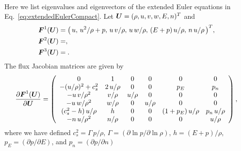 \documentclass[10pt,preprint]{aastex}
\begin{document}
Here we list eigenvalues and eigenvectors of the extended Euler equations in Eq.~\eqref{eq:extendedEulerCompact}.  
Let $\boldsymbol{U}=(\rho,u,v,w,E,n)^{T}$ and 
\begin{align}
  \boldsymbol{F}^{1}(\boldsymbol{U})
  &=\big(\,u,\,u^{2}/\rho+p,\,u\,v/\rho,\,u\,w/\rho,\,(E+p)\,u/\rho,\,n\,u/\rho\,\big)^{T}, \\
  \boldsymbol{F}^{2}(\boldsymbol{U})
  &=, \\
  \boldsymbol{F}^{3}(\boldsymbol{U})
  &=.
\end{align}
The flux Jacobian matrices are given by
\begin{align}
  \frac{\partial \boldsymbol{F}^{1}(\boldsymbol{U})}{\partial \boldsymbol{U}}
  =
  \left(
  \begin{array}{cccccc}
  0 & 1 & 0 & 0 & 0 & 0 \\
  -(u/\rho)^{2}+c_{s}^{2} & 2\,u/\rho & 0 & 0 & p_{E} & p_{n} \\
  - u\,v/\rho^{2} & v/\rho & u/\rho & 0 & 0 & 0 \\
  - u\,w/\rho^{2} & w/\rho & 0 & u/\rho & 0 & 0 \\
  (c_{s}^{2}-h)\,u/\rho & h & 0 & 0 & (1+p_{E})\,u/\rho & p_{n}\,u/\rho \\
  -n\,u/\rho^{2} & n/\rho & 0 & 0 & 0 & u/\rho
  \end{array}
  \right),
\end{align}
where we have defined $c_{s}^{2}=\Gamma\,p/\rho$, $\Gamma=(\partial\ln p/\partial\ln \rho)$, $h=(E+p)/\rho$, $p_{E}=(\partial p/\partial E)$, and $p_{n}=(\partial p/\partial n)$
\end{document}
